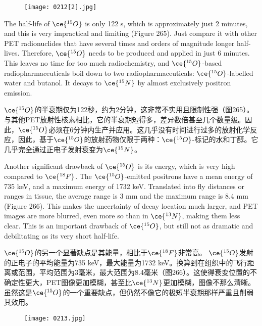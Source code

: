 \documentclass[dvipsnames, svgnames,a4paper,11pt]{article}
\begin{document}
\begin{figure}[h]
	\centering
    \texttt{[image: 0212[2].jpg]}  
     \label{fig265}
\end{figure}

The half-life of \(\ce{^{15}O}\) is only 122 s, which is approximately just 2 minutes, and this is very impractical and limiting (Figure 265). Just compare it with other PET radionuclides that have several times and orders of magnitude longer half-lives. Therefore, \(\ce{^{15}O}\) needs to be produced and applied in just 6 minutes. This leaves no time for too much radiochemistry, and \(\ce{^{15}O}\)-based radiopharmaceuticals boil down to two radiopharmaceuticals: \(\ce{^{15}O}\)-labelled water and butanol. It decays to \(\ce{^{15}N}\) by almost exclusively positron emission.

\(\ce{^{15}O}\)的半衰期仅为122秒，约为2分钟，这非常不实用且限制性强（图265）。与其他PET放射性核素相比，它的半衰期短得多，差异数倍甚至几个数量级。因此，\(\ce{^{15}O}\)必须在6分钟内生产并应用。这几乎没有时间进行过多的放射化学反应，因此，基于\(\ce{^{15}O}\)的放射药物仅限于两种：\(\ce{^{15}O}\)-标记的水和丁醇。它几乎完全通过正电子发射衰变为\(\ce{^{15}N}\)。



Another significant drawback of \(\ce{^{15}O}\) is its energy, which is very high compared to \(\ce{^{18}F}\). The \(\ce{^{15}O}\)-emitted positrons have a mean energy of 735 keV, and a maximum energy of 1732 keV. Translated into fly distances or ranges in tissue, the average range is 3 mm and the maximum range is 8.4 mm (Figure 266). This makes the uncertainty of decay location much larger, and PET images are more blurred, even more so than in \(\ce{^{13}N}\), making them less clear. This is an important drawback of \(\ce{^{15}O}\), but still not as dramatic and debilitating as its very short half-life.

\(\ce{^{15}O}\)的另一个显著缺点是其能量，相比于\(\ce{^{18}F}\)非常高。 \(\ce{^{15}O}\)发射的正电子的平均能量为735 keV，最大能量为1732 keV。换算到在组织中的飞行距离或范围，平均范围为3毫米，最大范围为8.4毫米（图266）。这使得衰变位置的不确定性更大，PET图像更加模糊，甚至比\(\ce{^{13}N}\)更加模糊，图像不那么清晰。虽然这是\(\ce{^{15}O}\)的一个重要缺点，但仍然不像它的极短半衰期那样严重且削弱其效用。

\begin{figure}[h]
	\centering
    \texttt{[image: 0213.jpg]}  
 \label{fig266}
\end{figure}
\end{document}
